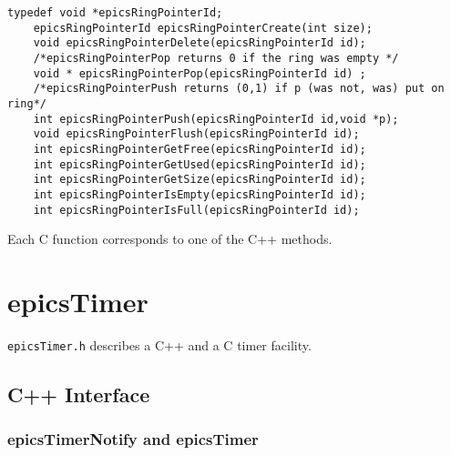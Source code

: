 \begin{verbatim}typedef void *epicsRingPointerId;
    epicsRingPointerId epicsRingPointerCreate(int size);
    void epicsRingPointerDelete(epicsRingPointerId id);
    /*epicsRingPointerPop returns 0 if the ring was empty */
    void * epicsRingPointerPop(epicsRingPointerId id) ;
    /*epicsRingPointerPush returns (0,1) if p (was not, was) put on ring*/
    int epicsRingPointerPush(epicsRingPointerId id,void *p);
    void epicsRingPointerFlush(epicsRingPointerId id);
    int epicsRingPointerGetFree(epicsRingPointerId id);
    int epicsRingPointerGetUsed(epicsRingPointerId id);
    int epicsRingPointerGetSize(epicsRingPointerId id);
    int epicsRingPointerIsEmpty(epicsRingPointerId id);
    int epicsRingPointerIsFull(epicsRingPointerId id);
\end{verbatim}
Each C function corresponds to one of the C++ methods.

\section{epicsTimer}

\verb|epicsTimer.h| describes a C++ and a C timer facility.

\subsection{C++ Interface}

\subsubsection{epicsTimerNotify and epicsTimer}

